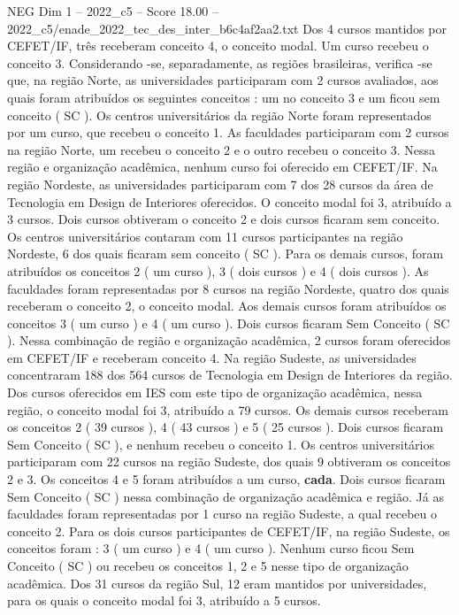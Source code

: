 \begin{textsample}{NEG Dim 1 – 2022\_c5 – Score 18.00 – 2022\_c5/enade\_2022\_tec\_des\_inter\_b6c4af2aa2.txt}
Dos 4 cursos mantidos por CEFET/IF, três receberam conceito 4, o conceito modal.
Um curso recebeu o conceito 3.
Considerando -se, separadamente, as regiões brasileiras, verifica -se que, na região Norte, as universidades participaram com 2 cursos avaliados, aos quais foram atribuídos os seguintes conceitos : um no conceito 3 e um ficou sem conceito ( SC ).
Os centros universitários da região Norte foram representados por um curso, que recebeu o conceito 1.
As faculdades participaram com 2 cursos na região Norte, um recebeu o conceito 2 e o outro recebeu o conceito 3.
Nessa região e organização acadêmica, nenhum curso foi oferecido em CEFET/IF.
Na região Nordeste, as universidades participaram com 7 dos 28 cursos da área de Tecnologia em Design de Interiores oferecidos.
O conceito modal foi 3, atribuído a 3 cursos.
Dois cursos obtiveram o conceito 2 e dois cursos ficaram sem conceito.
Os centros universitários contaram com 11 cursos participantes na região Nordeste, 6 dos quais ficaram sem conceito ( SC ).
Para os demais cursos, foram atribuídos os conceitos 2 ( um curso ), 3 ( dois cursos ) e 4 ( dois cursos ).
As faculdades foram representadas por 8 cursos na região Nordeste, quatro dos quais receberam o conceito 2, o conceito modal.
Aos demais cursos foram atribuídos os conceitos 3 ( um curso ) e 4 ( um curso ).
Dois cursos ficaram Sem Conceito ( SC ).
Nessa combinação de região e organização acadêmica, 2 cursos foram oferecidos em CEFET/IF e receberam conceito 4.
Na região Sudeste, as universidades concentraram 188 dos 564 cursos de Tecnologia em Design de Interiores da região.
Dos cursos oferecidos em IES com este tipo de organização acadêmica, nessa região, o conceito modal foi 3, atribuído a 79 cursos.
Os demais cursos receberam os conceitos 2 ( 39 cursos ), 4 ( 43 cursos ) e 5 ( 25 cursos ).
Dois cursos ficaram Sem Conceito ( SC ), e nenhum recebeu o conceito 1.
Os centros universitários participaram com 22 cursos na região Sudeste, dos quais 9 obtiveram os conceitos 2 e 3.
Os conceitos 4 e 5 foram atribuídos a um curso, \textbf{cada}.
Dois cursos ficaram Sem Conceito ( SC ) nessa combinação de organização acadêmica e região.
Já as faculdades foram representadas por 1 curso na região Sudeste, a qual recebeu o conceito 2.
Para os dois cursos participantes de CEFET/IF, na região Sudeste, os conceitos foram : 3 ( um curso ) e 4 ( um curso ).
Nenhum curso ficou Sem Conceito ( SC ) ou recebeu os conceitos 1, 2 e 5 nesse tipo de organização acadêmica.
Dos 31 cursos da região Sul, 12 eram mantidos por universidades, para os quais o conceito modal foi 3, atribuído a 5 cursos.

\end{textsample}
